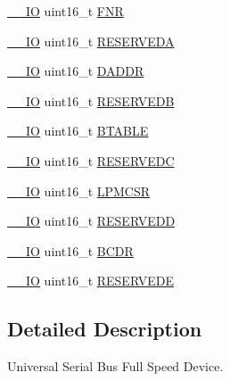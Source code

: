 \begin{DoxyCompactItemize}
\item 
\hyperlink{core__sc300_8h_aec43007d9998a0a0e01faede4133d6be}{\+\_\+\+\_\+\+IO} uint16\+\_\+t \hyperlink{struct_u_s_b___type_def_a5ecb1ade997ff76fd2ff76370717d464}{F\+NR}
\item 
\hyperlink{core__sc300_8h_aec43007d9998a0a0e01faede4133d6be}{\+\_\+\+\_\+\+IO} uint16\+\_\+t \hyperlink{struct_u_s_b___type_def_aaa3240660b9b6f379ecdffd4d440f726}{R\+E\+S\+E\+R\+V\+E\+DA}
\item 
\hyperlink{core__sc300_8h_aec43007d9998a0a0e01faede4133d6be}{\+\_\+\+\_\+\+IO} uint16\+\_\+t \hyperlink{struct_u_s_b___type_def_ae95ebb359f2974e0f25b27e488978922}{D\+A\+D\+DR}
\item 
\hyperlink{core__sc300_8h_aec43007d9998a0a0e01faede4133d6be}{\+\_\+\+\_\+\+IO} uint16\+\_\+t \hyperlink{struct_u_s_b___type_def_a952c408bacd5ee662017440986eca043}{R\+E\+S\+E\+R\+V\+E\+DB}
\item 
\hyperlink{core__sc300_8h_aec43007d9998a0a0e01faede4133d6be}{\+\_\+\+\_\+\+IO} uint16\+\_\+t \hyperlink{struct_u_s_b___type_def_a045130eb8c2d3eb353a4417f24f34f46}{B\+T\+A\+B\+LE}
\item 
\hyperlink{core__sc300_8h_aec43007d9998a0a0e01faede4133d6be}{\+\_\+\+\_\+\+IO} uint16\+\_\+t \hyperlink{struct_u_s_b___type_def_a9af23dac80d50cdf937b9fbbc4add948}{R\+E\+S\+E\+R\+V\+E\+DC}
\item 
\hyperlink{core__sc300_8h_aec43007d9998a0a0e01faede4133d6be}{\+\_\+\+\_\+\+IO} uint16\+\_\+t \hyperlink{struct_u_s_b___type_def_ae21a63f0e47e2b526ec7087deca91d96}{L\+P\+M\+C\+SR}
\item 
\hyperlink{core__sc300_8h_aec43007d9998a0a0e01faede4133d6be}{\+\_\+\+\_\+\+IO} uint16\+\_\+t \hyperlink{struct_u_s_b___type_def_a2eaf7996b107c6bf4c1930b05241420c}{R\+E\+S\+E\+R\+V\+E\+DD}
\item 
\hyperlink{core__sc300_8h_aec43007d9998a0a0e01faede4133d6be}{\+\_\+\+\_\+\+IO} uint16\+\_\+t \hyperlink{struct_u_s_b___type_def_afa745ad72775fcf145e7637311dc2852}{B\+C\+DR}
\item 
\hyperlink{core__sc300_8h_aec43007d9998a0a0e01faede4133d6be}{\+\_\+\+\_\+\+IO} uint16\+\_\+t \hyperlink{struct_u_s_b___type_def_a0fdf1be4be4317a597f6b5f1f667290b}{R\+E\+S\+E\+R\+V\+E\+DE}
\end{DoxyCompactItemize}


\subsection{Detailed Description}
Universal Serial Bus Full Speed Device. 

